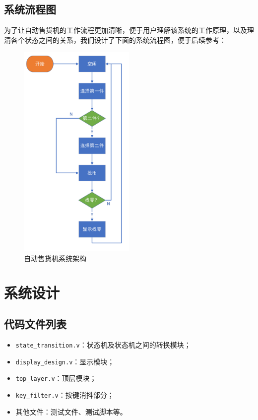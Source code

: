 \documentclass[12pt]{SEU-Circuit-Report}
\begin{document}
    \subsection{系统流程图}
    为了让自动售货机的工作流程更加清晰，便于用户理解该系统的工作原理，以及理清各个状态之间的关系，我们设计了下面的系统流程图，便于后续参考：
    \begin{figure}[htbp]
        \centering
        \includegraphics[width=0.5\textwidth]{fig/flowchart.pdf}
        \caption{自动售货机系统架构}
        \label{fig:flowchart}
    \end{figure}
    \section{系统设计}
    \subsection{代码文件列表}
    \begin{itemize}
        \item \texttt{state\_transition.v}：状态机及状态机之间的转换模块；
        \item \texttt{display\_design.v}：显示模块；
        \item \texttt{top\_layer.v}：顶层模块；
        \item \texttt{key\_filter.v}：按键消抖部分；
        \item 其他文件：测试文件、测试脚本等。
    \end{itemize}
\end{document}
